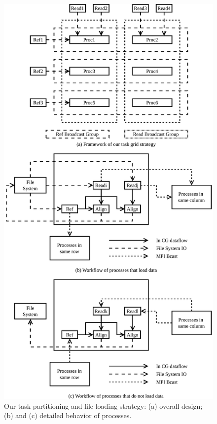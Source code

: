 \documentclass[conference]{IEEEtran}
\begin{document}
\begin{figure}[!htb]
	\includegraphics[width=\linewidth]{GridNew}
	\caption{Our task-partitioning and file-loading strategy: (a) overall design; (b) and (c) detailed behavior of processes.}
	\label{TaskGrid}
\end{figure}
\end{document}
